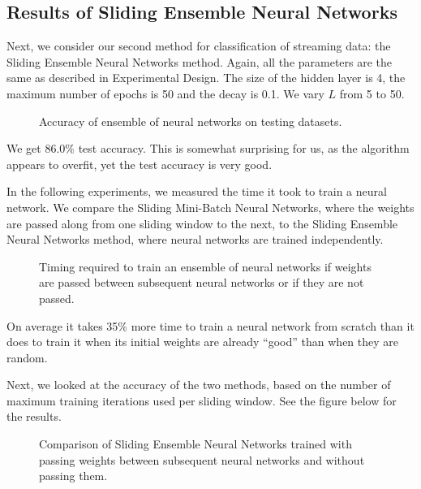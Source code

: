 \documentclass[conference]{IEEEtran}
\begin{document}
		
		\subsection{Results of Sliding Ensemble Neural Networks}
		
		Next, we consider our second method for classification of streaming data: the Sliding Ensemble Neural Networks method.
		Again, all the parameters are the same as described in Experimental Design. The size of the hidden layer is 4, the maximum number of epochs is 50 and the decay is 0.1. We vary $L$ from 5 to 50.
		
		\begin{figure}[H]
			\centering
			\caption{Accuracy of ensemble of neural networks on  testing datasets.}
			\label{fig:results-nnet-ensemble}
		\end{figure}
		
		We get 86.0\% test accuracy. This is somewhat surprising for us, as the algorithm appears to overfit, yet the test accuracy is very good.
		
		In the following experiments, we measured the time it took to train a neural network. We compare the Sliding Mini-Batch Neural Networks, where the weights are passed along from one sliding window to the next, to the Sliding Ensemble Neural Networks method, where neural networks are trained independently.
		
		\begin{figure}[H]
			\centering
			\caption{Timing required to train an ensemble of neural networks if weights are passed between subsequent neural networks or if they are not passed.}
			\label{fig:results-nnet-ens-timing}
		\end{figure}
		
		On average it takes 35\% more time to train a neural network from scratch than it does to train it when its initial weights are already ``good'' than when they are random.
		
		Next, we looked at the accuracy of the two methods, based on the number of maximum training iterations used per sliding window. See the figure below for the results.
		\begin{figure}[H]
			\centering
			\caption{Comparison of Sliding Ensemble Neural Networks trained with passing weights between subsequent neural networks and without passing them.}
			\label{fig:benchmark}
		\end{figure}
		
\end{document}

